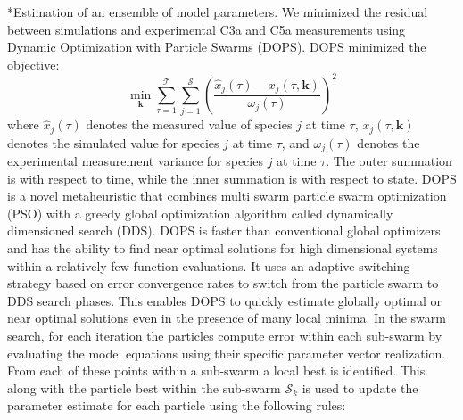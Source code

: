 \documentclass[12pt]{article}
\makeatletter
\renewcommand\subsection{\@startsection
	{subsection}{2}{0mm}
	{-0.05in}
	{-0.5\baselineskip}
	{\normalfont\normalsize\bfseries}}
\makeatother
\begin{document}
\subsection*{Estimation of an ensemble of model parameters.}
We minimized the residual between simulations and experimental C3a and C5a measurements using Dynamic Optimization with Particle Swarms (DOPS). DOPS minimized the objective:
\begin{equation}\label{eqn:objective-function}
	\min_{\mathbf{k}} \sum_{\tau=1}^{\mathcal{T}}\sum_{j=1}^{\mathcal{S}}\left(\frac{\hat{x}_{j}\left(\tau\right) - x_{j}\left(\tau,\mathbf{k}\right)}{\omega_{j}\left(\tau\right)}\right)^{2}
\end{equation}where $\hat{x}_{j}\left(\tau\right)$ denotes the measured value of species $j$ at time $\tau$, $x_{j}\left(\tau,\mathbf{k}\right)$ denotes the simulated
value for species $j$ at time $\tau$, and $\omega_{j}\left(\tau\right)$ denotes the experimental measurement variance for species $j$ at time $\tau$. The outer summation is with respect to
time, while the inner summation is with respect to state. DOPS is a novel metaheuristic that combines multi swarm particle swarm optimization (PSO) with a greedy global optimization algorithm called dynamically dimensioned search (DDS).
DOPS is faster than conventional global optimizers and has the ability to find near optimal solutions for high dimensional systems within a relatively few function evaluations.
It uses an adaptive switching strategy based on error convergence rates to switch from the particle swarm to DDS search phases.
This enables DOPS to quickly estimate globally optimal or near optimal solutions even in the presence of many local minima.
In the swarm search, for each iteration the particles compute error within each sub-swarm by evaluating the model equations using their specific parameter vector realization. From each of these points within a sub-swarm a local best is identified. This along with the particle best within the sub-swarm $\mathcal{S}_{k}$ is used to update the parameter estimate for each particle using the following rules:
\end{document}

